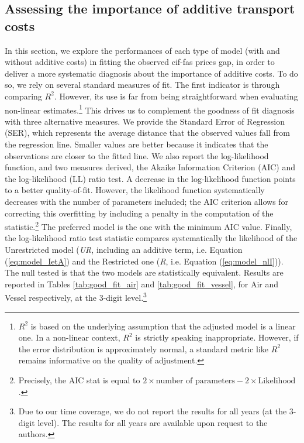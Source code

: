 \documentclass[a4paper,11pt]{article}
\begin{document}
\subsection{Assessing the importance of additive transport costs}

In this section, we explore the performances of each type of model (with and without additive costs) in fitting the observed cif-fas prices gap, in order to deliver a more systematic diagnosis about the importance of additive costs. To do so, we rely on several standard measures of fit. The first indicator is through comparing $R^{2}$. However, its use is far from being straightforward when evaluating non-linear estimates.\footnote{$R^2$ is based on the underlying assumption that the adjusted model is a linear one. In a non-linear context, $R^2$ is  strictly speaking inappropriate. However, if the error distribution is approximately normal, a standard metric like $R^2$ remains informative on the quality of adjustment.} This drives us to complement the goodness of fit diagnosis with three alternative measures. We provide the Standard Error of Regression (SER), which represents the average distance that the observed values fall from the regression line. Smaller values are better because it indicates that the observations are closer to the fitted line. We also report the log-likelihood function, and two measures derived, the Akaike Information Criterion (AIC) and the log-likelihood (LL) ratio test. A decrease in the log-likelihood function points to a better quality-of-fit. However, the likelihood function systematically decreases with the number of parameters included; the AIC criterion allows for correcting this overfitting by including a penalty in the computation of the statistic.\footnote{Precisely, the AIC stat is equal to $2 \times \textrm{number of parameters} - 2 \times \textrm{Likelihood} $.} The preferred model is the one with the minimum AIC value. Finally, the log-likelihood ratio test statistic compares systematically the likelihood of the Unrestricted model (\emph{UR}, including an additive term, i.e. Equation (\ref{eq:model_IetA}) and the Restricted one (\emph{R}, i.e. Equation (\ref{eq:model_nlI})). The null tested is that the two models are statistically equivalent. Results are reported in Tables \ref{tab:good_fit_air} and \ref{tab:good_fit_vessel}, for Air and Vessel respectively, at the 3-digit level.\footnote{Due to our time coverage, we do not report the results for all years (at the 3-digit level). The results for all years are available upon request to the authors.}\medskip
\end{document}
